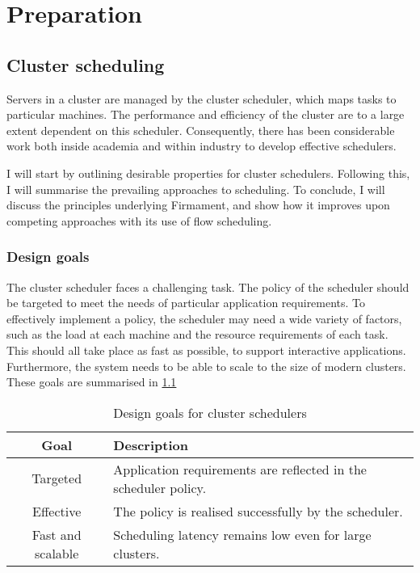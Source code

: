 \chapter{Preparation} \label{chap:prep}


\section{Cluster scheduling} \label{sec:prep-scheduling}

Servers in a cluster are managed by the cluster scheduler, which maps tasks to particular machines. The performance and efficiency of the cluster are to a large extent dependent on this scheduler. Consequently, there has been considerable work both inside academia and within industry to develop effective schedulers.

I will start by outlining desirable properties for cluster schedulers. Following this, I will summarise the prevailing approaches to scheduling. To conclude, I will discuss the principles underlying Firmament, and show how it improves upon competing approaches with its use of flow scheduling.

\subsection{Design goals}

The cluster scheduler faces a challenging task. The policy of the scheduler should be targeted to meet the needs of particular application requirements. To effectively implement a policy, the scheduler may need a wide variety of factors, such as the load at each machine and the resource requirements of each task. This should all take place as fast as possible, to support interactive applications. Furthermore, the system needs to be able to scale to the size of modern clusters. These goals are summarised in \cref{table:cluster-scheduler-design-goals}

\begin{table}
    \begin{tabular}{c|l}
        Goal & Description\tabularnewline
        \hline
        Targeted & Application requirements are reflected in the scheduler policy. \tabularnewline
        Effective & The policy is realised successfully by the scheduler. \tabularnewline
        Fast and scalable & Scheduling latency remains low even for large clusters. \tabularnewline
    \end{tabular}
    \caption{Design goals for cluster schedulers}
    \label{table:cluster-scheduler-design-goals}
\end{table}

